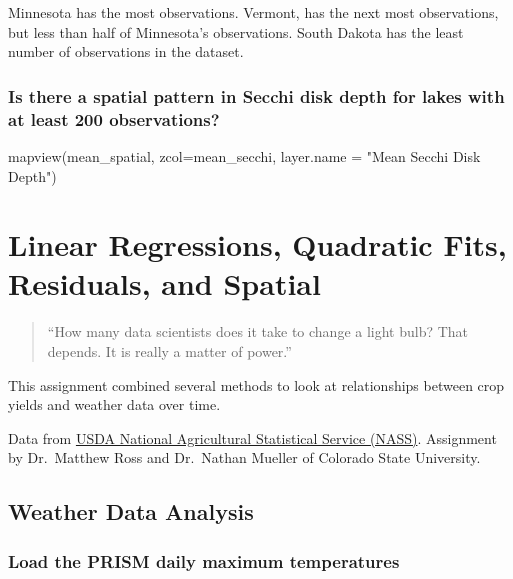 \documentclass[
]{book}
\newenvironment{Shaded}{\begin{snugshade}}{\end{snugshade}}
\newcommand{\AttributeTok}[1]{\textcolor[rgb]{0.77,0.63,0.00}{#1}}
\newcommand{\FunctionTok}[1]{\textcolor[rgb]{0.00,0.00,0.00}{#1}}
\newcommand{\NormalTok}[1]{#1}
\newcommand{\StringTok}[1]{\textcolor[rgb]{0.31,0.60,0.02}{#1}}
\begin{document}
Minnesota has the most observations. Vermont, has the next most observations, but less than half of Minnesota's observations. South Dakota has the least number of observations in the dataset.

\hypertarget{is-there-a-spatial-pattern-in-secchi-disk-depth-for-lakes-with-at-least-200-observations}{%
\subsection{Is there a spatial pattern in Secchi disk depth for lakes with at least 200 observations?}\label{is-there-a-spatial-pattern-in-secchi-disk-depth-for-lakes-with-at-least-200-observations}}

\begin{Shaded}
\begin{Highlighting}[]
\FunctionTok{mapview}\NormalTok{(mean\_spatial, }\AttributeTok{zcol=}\StringTok{\textquotesingle{}mean\_secchi\textquotesingle{}}\NormalTok{, }\AttributeTok{layer.name =} \StringTok{"Mean Secchi Disk Depth"}\NormalTok{)}
\end{Highlighting}
\end{Shaded}

\hypertarget{linear-regressions-quadratic-fits-residuals-and-spatial}{%
\chapter{Linear Regressions, Quadratic Fits, Residuals, and Spatial}\label{linear-regressions-quadratic-fits-residuals-and-spatial}}

\begin{quote}
``How many data scientists does it take to change a light bulb? That depends. It is really a matter of power.''
\end{quote}

This assignment combined several methods to look at relationships between crop yields and weather data over time.

Data from \href{https://quickstats.nass.usda.gov/}{USDA National Agricultural Statistical Service (NASS)}. Assignment by Dr.~Matthew Ross and Dr.~Nathan Mueller of Colorado State University.

\hypertarget{weather-data-analysis}{%
\section{Weather Data Analysis}\label{weather-data-analysis}}

\hypertarget{load-the-prism-daily-maximum-temperatures}{%
\subsection{Load the PRISM daily maximum temperatures}\label{load-the-prism-daily-maximum-temperatures}}
\end{document}
